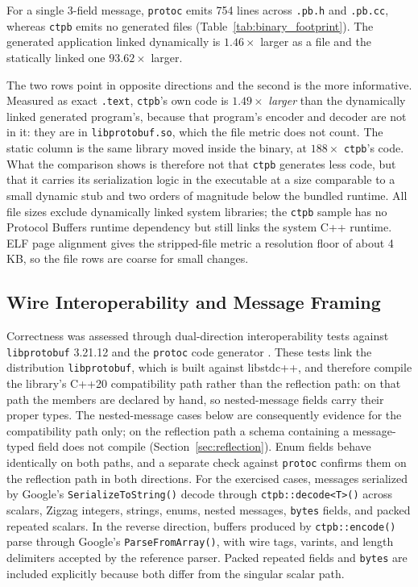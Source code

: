 For a single 3-field message, \texttt{protoc} emits 754 lines across \texttt{.pb.h} and \texttt{.pb.cc}, whereas \texttt{ctpb} emits no generated files (Table~\ref{tab:binary_footprint}). The generated application linked dynamically is $1.46\times$ larger as a file and the statically linked one $93.62\times$ larger.

The two rows point in opposite directions and the second is the more informative. Measured as exact \texttt{.text}, \texttt{ctpb}'s own code is $1.49\times$ \emph{larger} than the dynamically linked generated program's, because that program's encoder and decoder are not in it: they are in \texttt{libprotobuf.so}, which the file metric does not count. The static column is the same library moved inside the binary, at $188\times$ \texttt{ctpb}'s code. What the comparison shows is therefore not that \texttt{ctpb} generates less code, but that it carries its serialization logic in the executable at a size comparable to a small dynamic stub and two orders of magnitude below the bundled runtime. All file sizes exclude dynamically linked system libraries; the \texttt{ctpb} sample has no Protocol Buffers runtime dependency but still links the system C++ runtime. ELF page alignment gives the stripped-file metric a resolution floor of about 4\,KB, so the file rows are coarse for small changes.

\subsection{Wire Interoperability and Message Framing}
\label{sec:interop}
Correctness was assessed through dual-direction interoperability tests against \texttt{libprotobuf} 3.21.12 and the \texttt{protoc} code generator \cite{protobuf_spec}. These tests link the distribution \texttt{libprotobuf}, which is built against libstdc++, and therefore compile the library's C++20 compatibility path rather than the reflection path: on that path the members are declared by hand, so nested-message fields carry their proper types. The nested-message cases below are consequently evidence for the compatibility path only; on the reflection path a schema containing a message-typed field does not compile (Section~\ref{sec:reflection}). Enum fields behave identically on both paths, and a separate check against \texttt{protoc} confirms them on the reflection path in both directions. For the exercised cases, messages serialized by Google's \texttt{SerializeToString()} decode through \texttt{ctpb::decode<T>()} across scalars, Zigzag integers, strings, enums, nested messages, \texttt{bytes} fields, and packed repeated scalars. In the reverse direction, buffers produced by \texttt{ctpb::encode()} parse through Google's \texttt{ParseFromArray()}, with wire tags, varints, and length delimiters accepted by the reference parser. Packed repeated fields and \texttt{bytes} are included explicitly because both differ from the singular scalar path.


